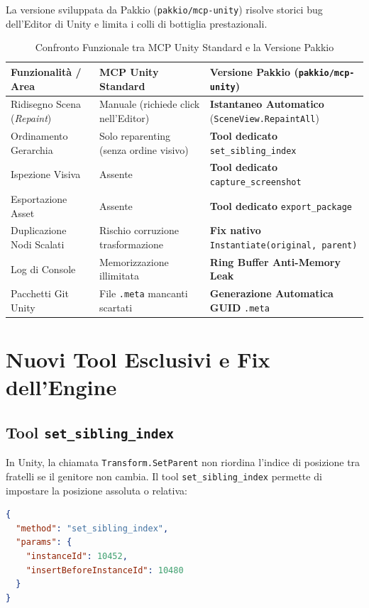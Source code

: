 \documentclass[11pt,a4paper]{article}
\begin{document}
La versione sviluppata da Pakkio (\texttt{pakkio/mcp-unity}) risolve storici bug dell'Editor di Unity e limita i colli di bottiglia prestazionali.

\begin{table}[h!]
\centering
\caption{Confronto Funzionale tra MCP Unity Standard e la Versione Pakkio}
\vspace{0.5em}
\begin{tabular}{lll}
\toprule
\textbf{Funzionalità / Area} & \textbf{MCP Unity Standard} & \textbf{Versione Pakkio (\texttt{pakkio/mcp-unity})} \\
\midrule
Ridisegno Scena (\textit{Repaint}) & Manuale (richiede click nell'Editor) & \textbf{Istantaneo Automatico} (\texttt{SceneView.RepaintAll}) \\
Ordinamento Gerarchia & Solo reparenting (senza ordine visivo) & \textbf{Tool dedicato} \texttt{set\_sibling\_index} \\
Ispezione Visiva & Assente & \textbf{Tool dedicato} \texttt{capture\_screenshot} \\
Esportazione Asset & Assente & \textbf{Tool dedicato} \texttt{export\_package} \\
Duplicazione Nodi Scalati & Rischio corruzione trasformazione & \textbf{Fix nativo} \texttt{Instantiate(original, parent)} \\
Log di Console & Memorizzazione illimitata & \textbf{Ring Buffer Anti-Memory Leak} \\
Pacchetti Git Unity & File \texttt{.meta} mancanti scartati & \textbf{Generazione Automatica GUID} \texttt{.meta} \\
\bottomrule
\end{tabular}
\end{table}

\section{Nuovi Tool Esclusivi e Fix dell'Engine}

\subsection{Tool \texttt{set\_sibling\_index}}
In Unity, la chiamata \texttt{Transform.SetParent} non riordina l'indice di posizione tra fratelli se il genitore non cambia. Il tool \texttt{set\_sibling\_index} permette di impostare la posizione assoluta o relativa:

\begin{lstlisting}[language=json, caption={Esempio di chiamata MCP per \texttt{set\_sibling\_index}}]
{
  "method": "set_sibling_index",
  "params": {
    "instanceId": 10452,
    "insertBeforeInstanceId": 10480
  }
}
\end{lstlisting}
\end{document}
